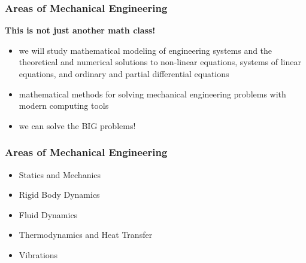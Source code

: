 \documentclass{ltx-talk} %
\newcommand{\sectionIsubsectionIItitle}{Areas of Mechanical Engineering}
\begin{document}
			\begin{frame}
				\frametitle{\sectionIsubsectionIItitle}

				\textbf{This is not just another math class!}\\

				\begin{itemize}
					\item we will study mathematical modeling of engineering systems and the theoretical and numerical solutions to non-linear equations, systems of linear equations, and ordinary and partial differential equations \\
					\item mathematical methods for solving mechanical engineering problems with modern computing tools\\
					\item we can solve the \large{BIG} problems!
				\end{itemize}  

				\btVFill
			\end{frame}

			\begin{frame}
				\frametitle{\sectionIsubsectionIItitle}

				\begin{itemize}
					\item Statics and Mechanics\\
					\item Rigid Body Dynamics\\
					\item Fluid Dynamics\\
					\item Thermodynamics and Heat Transfer\\
					\item Vibrations\\
				\end{itemize}  

				\btVFill
			\end{frame}

\end{document}
